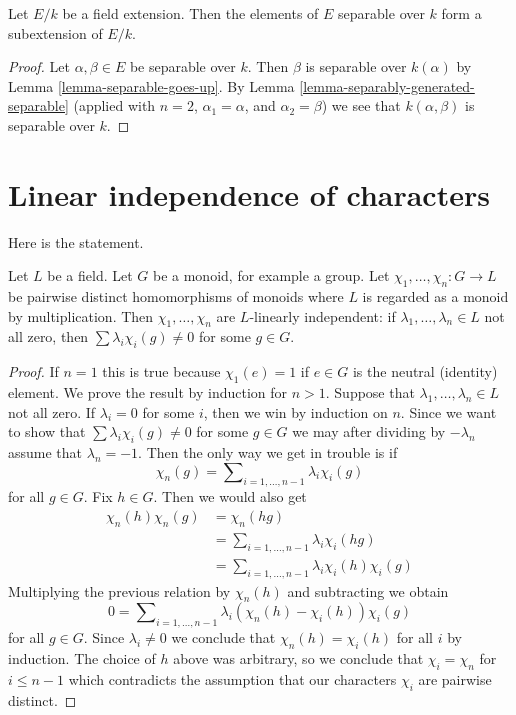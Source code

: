 \begin{lemma}
\label{lemma-separable-elements}
Let $E/k$ be a field extension. Then the elements of $E$ separable
over $k$ form a subextension of $E/k$.
\end{lemma}

\begin{proof}
Let $\alpha, \beta \in E$ be separable over $k$. Then $\beta$ is separable
over $k(\alpha)$ by Lemma \ref{lemma-separable-goes-up}.
By Lemma \ref{lemma-separably-generated-separable} (applied with $n = 2$,
$\alpha_1 = \alpha$, and $\alpha_2 = \beta$) we see that
$k(\alpha, \beta)$ is separable over $k$.
\end{proof}





\section{Linear independence of characters}
\label{section-independence-characters}

\noindent
Here is the statement.

\begin{lemma}
\label{lemma-independence-characters}
Let $L$ be a field. Let $G$ be a monoid, for example a group. Let
$\chi_1, \ldots, \chi_n : G \to L$ be pairwise distinct
homomorphisms of monoids where $L$ is regarded as a monoid
by multiplication. Then $\chi_1, \ldots, \chi_n$
are $L$-linearly independent: if $\lambda_1, \ldots, \lambda_n \in L$
not all zero, then $\sum \lambda_i\chi_i(g) \not = 0$
for some $g \in G$.
\end{lemma}

\begin{proof}
If $n = 1$ this is true because $\chi_1(e) = 1$ if $e \in G$ is the
neutral (identity) element. We prove the result by induction for $n > 1$.
Suppose that $\lambda_1, \ldots, \lambda_n \in L$ not all zero.
If $\lambda_i = 0$ for some $i$, then we win by induction on $n$.
Since we want to show that $\sum \lambda_i\chi_i(g) \not = 0$
for some $g \in G$ we may after dividing by $-\lambda_n$
assume that $\lambda_n = -1$. Then the only way we get in trouble
is if
$$
\chi_n(g) = \sum\nolimits_{i = 1, \ldots, n - 1} \lambda_i\chi_i(g)
$$
for all $g \in G$. Fix $h \in G$. Then we would also get
\begin{align*}
\chi_n(h)\chi_n(g) & = \chi_n(hg) \\
& = \sum\nolimits_{i = 1, \ldots, n - 1} \lambda_i\chi_i(hg) \\
& = \sum\nolimits_{i = 1, \ldots, n - 1} \lambda_i\chi_i(h) \chi_i(g)
\end{align*}
Multiplying the previous relation by $\chi_n(h)$ and subtracting we obtain
$$
0 = \sum\nolimits_{i = 1, \ldots, n - 1}
\lambda_i (\chi_n(h) - \chi_i(h)) \chi_i(g)
$$
for all $g \in G$. Since $\lambda_i \not = 0$ we conclude that
$\chi_n(h) = \chi_i(h)$ for all $i$ by induction.
The choice of $h$ above was arbitrary, so we conclude
that $\chi_i = \chi_n$ for $i \leq n - 1$ which contradicts
the assumption that our characters $\chi_i$ are pairwise distinct.
\end{proof}

